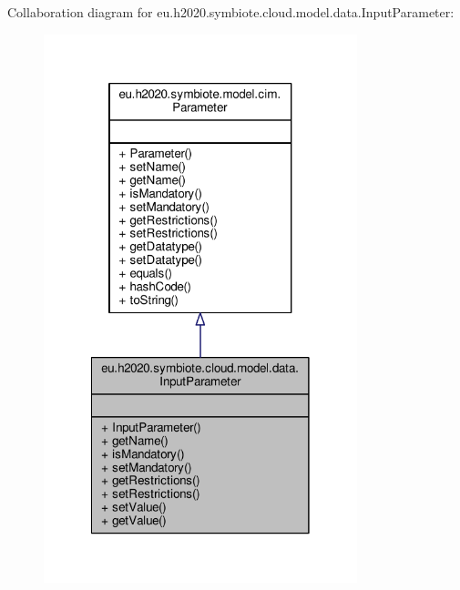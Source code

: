 Collaboration diagram for eu.\+h2020.\+symbiote.\+cloud.\+model.\+data.\+Input\+Parameter\+:\nopagebreak
\begin{figure}[H]
\begin{center}
\leavevmode
\includegraphics[width=258pt]{classeu_1_1h2020_1_1symbiote_1_1cloud_1_1model_1_1data_1_1InputParameter__coll__graph}
\end{center}
\end{figure}
